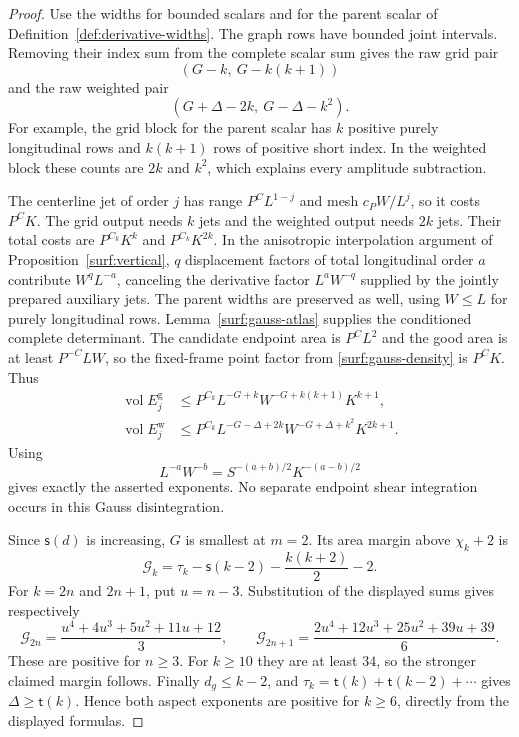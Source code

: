 \documentclass[11pt]{amsart}
\theoremstyle{definition}
\theoremstyle{remark}
\numberwithin{equation}{section}
\begin{document}
\begin{proof}
Use the widths for bounded scalars and for the parent scalar of Definition~\ref{def:derivative-widths}. The graph rows have bounded joint intervals. Removing their index sum from the complete scalar sum gives the raw grid pair
\[
 (G-k,\ G-k(k+1))
\]
and the raw weighted pair
\[
 (G+\Delta-2k,\ G-\Delta-k^2).
\]
For example, the grid block for the parent scalar has $k$ positive purely longitudinal rows and $k(k+1)$ rows of positive short index. In the weighted block these counts are $2k$ and $k^2$, which explains every amplitude subtraction.

The centerline jet of order $j$ has range $P^CL^{1-j}$ and mesh $c_PW/L^j$, so it costs $P^CK$. The grid output needs $k$ jets and the weighted output needs $2k$ jets. Their total costs are $P^{C_k}K^k$ and $P^{C_k}K^{2k}$. In the anisotropic interpolation argument of Proposition~\ref{surf:vertical}, $q$ displacement factors of total longitudinal order $a$ contribute $W^qL^{-a}$, canceling the derivative factor $L^aW^{-q}$ supplied by the jointly prepared auxiliary jets. The parent widths are preserved as well, using $W\le L$ for purely longitudinal rows. Lemma~\ref{surf:gauss-atlas} supplies the conditioned complete determinant. The candidate endpoint area is $P^CL^2$ and the good area is at least $P^{-C}LW$, so the fixed-frame point factor from \eqref{surf:gauss-density} is $P^CK$. Thus
\[
\begin{aligned}
\operatorname{vol}E_j^{\mathrm g}&\le P^{C_k}L^{-G+k}W^{-G+k(k+1)}K^{k+1},\\
\operatorname{vol}E_j^{\mathrm w}&\le P^{C_k}L^{-G-\Delta+2k}W^{-G+\Delta+k^2}K^{2k+1}.
\end{aligned}
\]
Using
\[
L^{-a}W^{-b}=S^{-(a+b)/2}K^{-(a-b)/2}
\]
gives exactly the asserted exponents. No separate endpoint shear integration occurs in this Gauss disintegration.

Since $\mathsf{s}(d)$ is increasing, $G$ is smallest at $m=2$. Its area margin above $\chi_k+2$ is
\[
 \mathcal G_k=\tau_k-\mathsf{s}(k-2)-\frac{k(k+2)}2-2.
\]
For $k=2n$ and $2n+1$, put $u=n-3$. Substitution of the displayed sums gives respectively
\[
 \mathcal G_{2n}=\frac{u^4+4u^3+5u^2+11u+12}{3},\qquad \mathcal G_{2n+1}=\frac{2u^4+12u^3+25u^2+39u+39}{6}.
\]
These are positive for $n\ge3$. For $k\ge10$ they are at least $34$, so the stronger claimed margin follows. Finally $d_g\le k-2$, and $\tau_k=\mathsf{t}(k)+\mathsf{t}(k-2)+\cdots$ gives $\Delta\ge \mathsf{t}(k)$. Hence both aspect exponents are positive for $k\ge6$, directly from the displayed formulas.
\end{proof}
\end{document}
